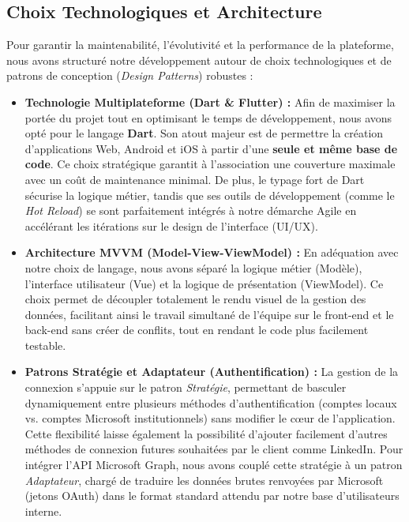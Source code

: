 \documentclass[a4paper,12pt]{article}
\begin{document}
\subsection{Choix Technologiques et Architecture}
Pour garantir la maintenabilité, l'évolutivité et la performance de la plateforme, nous avons structuré notre développement autour de choix technologiques et de patrons de conception (\textit{Design Patterns}) robustes :

\begin{itemize}[label={\color{accentColor}\textbullet}, itemsep=5pt]
    \item \textbf{Technologie Multiplateforme (Dart \& Flutter) :} Afin de maximiser la portée du projet tout en optimisant le temps de développement, nous avons opté pour le langage \textbf{Dart}. Son atout majeur est de permettre la création d'applications Web, Android et iOS à partir d'une \textbf{seule et même base de code}. Ce choix stratégique garantit à l'association une couverture maximale avec un coût de maintenance minimal. De plus, le typage fort de Dart sécurise la logique métier, tandis que ses outils de développement (comme le \textit{Hot Reload}) se sont parfaitement intégrés à notre démarche Agile en accélérant les itérations sur le design de l'interface (UI/UX).

    \item \textbf{Architecture MVVM (Model-View-ViewModel) :} En adéquation avec notre choix de langage, nous avons séparé la logique métier (Modèle), l'interface utilisateur (Vue) et la logique de présentation (ViewModel). Ce choix permet de découpler totalement le rendu visuel de la gestion des données, facilitant ainsi le travail simultané de l'équipe sur le front-end et le back-end sans créer de conflits, tout en rendant le code plus facilement testable.

    \item \textbf{Patrons Stratégie et Adaptateur (Authentification) :} La gestion de la connexion s'appuie sur le patron \textit{Stratégie}, permettant de basculer dynamiquement entre plusieurs méthodes d'authentification (comptes locaux vs. comptes Microsoft institutionnels) sans modifier le cœur de l'application. Cette flexibilité laisse également la possibilité d'ajouter facilement d'autres méthodes de connexion futures souhaitées par le client comme LinkedIn. Pour intégrer l'API Microsoft Graph, nous avons couplé cette stratégie à un patron \textit{Adaptateur}, chargé de traduire les données brutes renvoyées par Microsoft (jetons OAuth) dans le format standard attendu par notre base d'utilisateurs interne.
\end{itemize}
\end{document}
